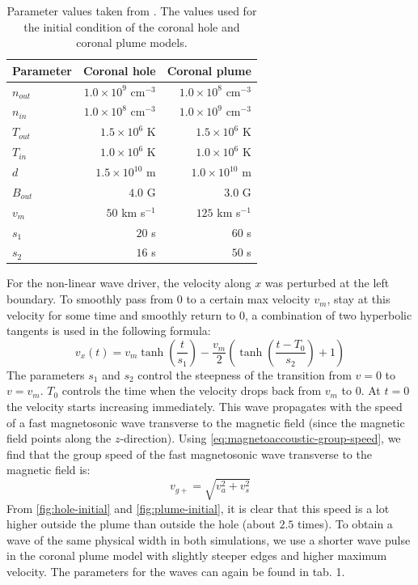 \begin{table}[H]
	\centering
	\begin{tabular}{|l|r|r|}
		\toprule
		Parameter & Coronal hole & Coronal plume\\
		\midrule
		$n_{out}$ & $1.0\times 10^9$ cm$^{-3}$ & $1.0\times 10^8$ cm$^{-3}$\\
		$n_{in}$ & $1.0\times 10^8$ cm$^{-3}$ & $1.0\times 10^9$ cm$^{-3}$\\
		$T_{out}$ & $1.5\times 10^6$ K & $1.5\times 10^6$ K\\
		$T_{in}$ & $1.0\times10^6$ K & $1.0\times10^6$ K\\
		$d$ & $1.5\times10^{10}$ m& $1.0\times10^{10}$ m \\
		$B_{out} $ & $4.0$ G & $3.0$ G\\
		\midrule
		$v_m$ & $50$ km s$^{-1}$ & $125$ km s$^{-1}$ \\
		$s_1$ & $20$ s & $60$ s \\
		$s_2$ & $16$ s& $50$ s\\
		\bottomrule
	\end{tabular}
	\caption{Parameter values taken from \cite{coronal-hole}. The values used for the initial condition of the coronal hole and coronal plume models.}
	\label{tab:parameters-hole}
\end{table}
For the non-linear wave driver, the velocity along $x$ was perturbed at the left boundary. 
To smoothly pass from $0$ to a certain max velocity $v_m$, stay at this velocity for some time and smoothly return to $0$, a combination of two hyperbolic tangents is used in the following formula:
\begin{equation}
	v_x(t) = v_m \tanh \left( \frac{t}{s_1} \right) - \frac{v_m}{2} \left( \tanh \left( \frac{t-T_0}{s_2} \right) +1 \right) 
\end{equation}
The parameters $s_1$ and $s_2$ control the steepness of the transition from $v=0$ to $v=v_m$.
$T_0$ controls the time when the velocity drops back from $v_m$ to $0$. At $t=0$ the velocity starts increasing immediately.
This wave propagates with the speed of a fast magnetosonic wave transverse to the magnetic field (since the magnetic field points along the $z$-direction).
Using \cref{eq:magnetoaccoustic-group-speed}, we find that the group speed of the fast magnetosonic wave transverse to the magnetic field is:
\begin{equation*}
	v_{g+} = \sqrt{v_a^2+v_s^2}
\end{equation*}
From \cref{fig:hole-initial} and \cref{fig:plume-initial}, it is clear that this speed is a lot higher outside the plume than outside the hole (about $2.5$ times).
To obtain a wave of the same physical width in both simulations, we use a shorter wave pulse in the coronal plume model with slightly steeper edges and higher maximum velocity.
The parameters for the waves can again be found in tab. 1.

